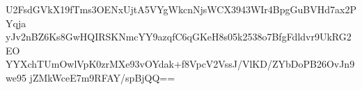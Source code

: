 U2FsdGVkX19fTms3OENxUjtA5VYgWkcnNjsWCX3943WIr4BpgGuBVHd7ax2PYqja
yJv2nBZ6Ks8GwHQIRSKNmcYY9azqfC6qGKeH8s05k2538o7BfgFdldvr9UkRG2EO
YYXchTUmOwlVpK0zrMXe93vOYdak+f8VpcV2VssJ/VlKD/ZYbDoPB26OvJn9we95
jZMkWceE7m9RFAY/spBjQQ==
